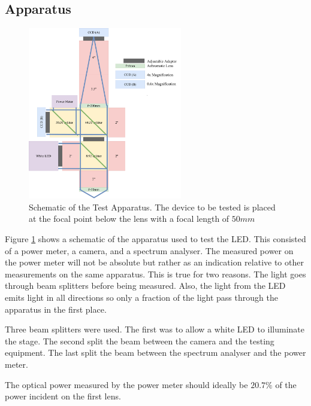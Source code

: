 \subsection{Apparatus}
\label{sec:test:apparatus}

\begin{figure}
  \centering
  \includegraphics[width=0.6\textwidth]{Figures/angus_bruce/apparatus_microandnano1.pdf}
  \caption{Schematic of the Test Apparatus. The device to be tested is placed at the focal point below the lens with a focal length of $50mm$}
  \label{fig:apparatus}
\end{figure}

Figure \ref{fig:apparatus} shows a schematic of the apparatus used to test the LED. This consisted of a power meter, a camera, and a spectrum analyser. The measured power on the power meter will not be absolute but rather as an indication relative to other measurements on the same apparatus. This is true for two reasons. The light goes through beam splitters before being measured. Also, the light from the LED emits light in all directions so only a fraction of the light pass through the apparatus in the first place.

Three beam splitters were used. The first was to allow a white LED to illuminate the stage. The second split the beam between the camera and the testing equipment. The last split the beam between the spectrum analyser and the power meter.

The optical power measured by the power meter should ideally be $20.7\%$ of the power incident on the first lens.
